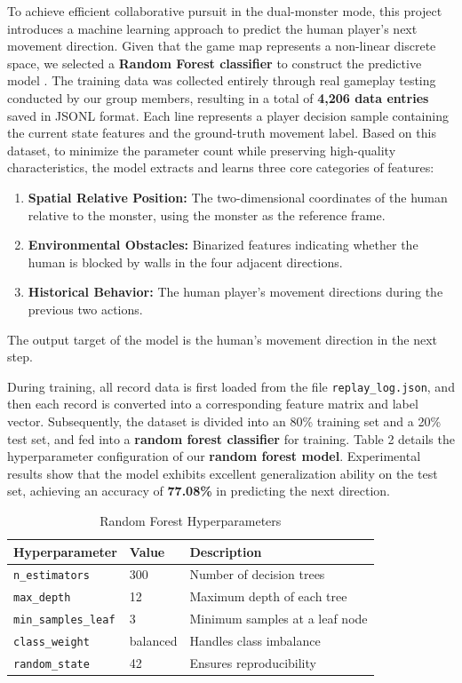 \documentclass[12pt,a4paper]{article}
\begin{document}
To achieve efficient collaborative pursuit in the dual-monster mode, this project introduces a machine learning approach to predict the human player's next movement direction. Given that the game map represents a non-linear discrete space, we selected a \textbf{Random Forest classifier} to construct the predictive model \cite{breiman2001randomforest}. The training data was collected entirely through real gameplay testing conducted by our group members, resulting in a total of \textbf{4,206 data entries} saved in JSONL format. Each line represents a player decision sample containing the current state features and the ground-truth movement label. Based on this dataset, to minimize the parameter count while preserving high-quality characteristics, the model extracts and learns three core categories of features: 
\begin{enumerate}
    \item \textbf{Spatial Relative Position:} The two-dimensional coordinates of the human relative to the monster, using the monster as the reference frame.
    \item \textbf{Environmental Obstacles:} Binarized features indicating whether the human is blocked by walls in the four adjacent directions.
    \item \textbf{Historical Behavior:} The human player's movement directions during the previous two actions. 
\end{enumerate}
The output target of the model is the human's movement direction in the next step.

During training, all record data is first loaded from the file \texttt{replay\_log.json}, and then each record is converted into a corresponding feature matrix and label vector. Subsequently, the dataset is divided into an 80\% training set and a 20\% test set, and fed into a \textbf{random forest classifier} for training. Table 2 details the hyperparameter configuration of our \textbf{random forest model}. Experimental results show that the model exhibits excellent generalization ability on the test set, achieving an accuracy of \textbf{77.08\%} in predicting the next direction.

\begin{table}[htbp]
    \centering
    \small
    \caption{Random Forest Hyperparameters}
    \label{tab:rf_hyperparameters}
    \begin{tabular}{lll}
        \toprule
        Hyperparameter & Value & Description \\
        \midrule
        \texttt{n\_estimators}      & 300      & Number of decision trees \\
        \texttt{max\_depth}         & 12       & Maximum depth of each tree \\
        \texttt{min\_samples\_leaf} & 3        & Minimum samples at a leaf node \\
        \texttt{class\_weight}      & balanced & Handles class imbalance \\
        \texttt{random\_state}      & 42       & Ensures reproducibility \\
        \bottomrule
    \end{tabular}
\end{table}
\end{document}
